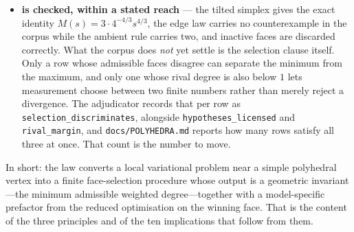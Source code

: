 \documentclass[11pt]{article}
\theoremstyle{definition}
\theoremstyle{remark}
\begin{document}
\begin{itemize}
  \item \textbf{is checked, within a stated reach} --- the tilted simplex
        gives the exact identity $M(s)=3\cdot4^{-4/3}s^{4/3}$, the edge law
        carries no counterexample in the corpus while the ambient rule carries
        two, and inactive faces are discarded correctly. What the corpus does
        \emph{not} yet settle is the selection clause itself. Only a row whose
        admissible faces disagree can separate the minimum from the maximum,
        and only one whose rival degree is also below $1$ lets measurement
        choose between two finite numbers rather than merely reject a
        divergence. The adjudicator records that per row as
        \texttt{selection\_discriminates}, alongside
        \texttt{hypotheses\_licensed} and \texttt{rival\_margin}, and
        \texttt{docs/POLYHEDRA.md} reports how many rows satisfy all three at
        once. That count is the number to move.
\end{itemize}

In short: the law converts a local variational problem near a simple
polyhedral vertex into a finite face-selection procedure whose output is a
geometric invariant---the minimum admissible weighted degree---together with a
model-specific prefactor from the reduced optimisation on the winning face.
That is the content of the three principles and of the ten implications that
follow from them.
\end{document}
